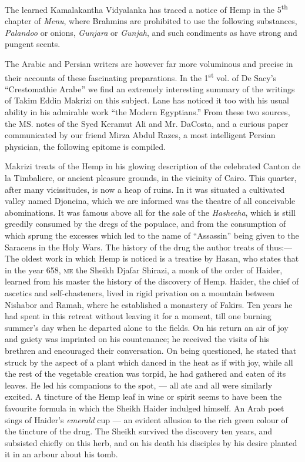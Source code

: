 \documentclass[a4paper, 11pt, oneside, polutonikogreek, english]{article}
\begin{document}
The learned Kamalakantha Vidyalanka has traced a notice of Hemp in the 5\textsuperscript{th} chapter of \emph{Menu}, where Brahmins are prohibited to use the following substances, \emph{Palandoo} or onions, \emph{Gunjara} or \emph{Gunjah}, and such condiments as have strong and pungent scents.

The Arabic and Persian writers are however far more voluminous and precise in their accounts of these fascinating preparations. In the 1\textsuperscript{st} vol. of De Sacy's ``Crestomathie Arabe'' we find an extremely interesting summary of the writings of Takim Eddin Makrizi on this subject. Lane has noticed it too with his usual ability in his admirable work ``the Modern Egyptians.'' From these two sources, the MS. notes of the Syed Keramut Ali and Mr. DaCosta, and a curious paper communicated by our friend Mirza Abdul Razes, a most intelligent Persian physician, the following epitome is compiled.

Makrizi treats of the Hemp in his glowing description of the celebrated Canton de la Timbaliere, or ancient pleasure grounds, in the vicinity of Cairo. This quarter, after many vicissitudes, is now a heap of ruins. In it was situated a cultivated valley named Djoneina, which we are informed was the theatre of all conceivable abominations. It was famous above all for the sale of the \emph{Hasheeha}, which is still greedily consumed by the dregs of the populace, and from the consumption of which sprung the excesses which led to the name of ``Assassin'' being given to the Saracens in the Holy Wars. The history of the drug the author treats of thus:--- The oldest work in which Hemp is noticed is a treatise by Hasan, who states that in the year 658, \textsc{me} the Sheikh Djafar Shirazi, a monk of the order of Haider, learned from his master the history of the discovery of Hemp. Haider, the chief of ascetics and self-chasteners, lived in rigid privation on a mountain between Nishabor and Ramah, where he established a monastery of Fakirs. Ten years he had spent in this retreat without leaving it for a moment, till one burning summer's day when he departed alone to the fields. On his return an air of joy and gaiety was imprinted on his countenance; he received the visits of his brethren and encouraged their conversation. On being questioned, he stated that struck by the aspect of a plant which danced in the heat as if with joy, while all the rest of the vegetable creation was torpid, he had gathered and eaten of its leaves. He led his companions to the spot, --- all ate and all were similarly excited. A tincture of the Hemp leaf in wine or spirit seems to have been the favourite formula in which the Sheikh Haider indulged himself. An Arab poet sings of Haider's \emph{emerald} cup --- an evident allusion to the rich green colour of the tincture of the drug. The Sheikh survived the discovery ten years, and subsisted chiefly on this herb, and on his death his disciples by his desire planted it in an arbour about his tomb.
\end{document}
